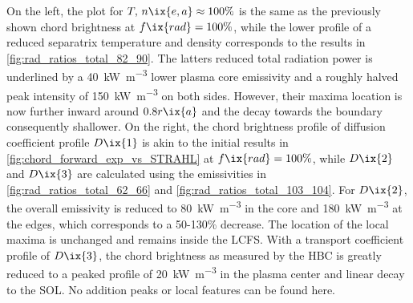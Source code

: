             On the left, the plot for $T,\,n\ix{e,a}\approx100\%$ is the same as the previously shown chord brightness at $f\ix{rad}=100\%$, while the lower profile of a reduced separatrix temperature and density corresponds to the results in \cref{fig:rad_ratios_total_82_90}. The latters reduced total radiation power is underlined by a \SI{40}{\kilo\watt\per\cubic\meter} lower plasma core emissivity and a roughly halved peak intensity of \SI{150}{\kilo\watt\per\cubic\meter} on both sides. However, their maxima location is now further inward around $0.8r\ix{a}$ and the decay towards the boundary consequently shallower. On the right, the chord brightness profile of diffusion coefficient profile $D\ix{1}$ is akin to the initial results in \cref{fig:chord_forward_exp_vs_STRAHL} at $f\ix{rad}=100\%$, while $D\ix{2}$ and $D\ix{3}$ are calculated using the emissivities in \cref{fig:rad_ratios_total_62_66} and \ref{fig:rad_ratios_total_103_104}. For $D\ix{2}$, the overall emissivity is reduced to \SI{80}{\kilo\watt\per\cubic\meter} in the core and \SI{180}{\kilo\watt\per\cubic\meter} at the edges, which corresponds to a 50-130\% decrease. The location of the local maxima is unchanged and remains inside the LCFS. With a transport coefficient profile of $D\ix{3}$, the chord brightness as measured by the HBC is greatly reduced to a peaked profile of \SI{20}{\kilo\watt\per\cubic\meter} in the plasma center and linear decay to the SOL. No addition peaks or local features can be found here.\\%
%
            \begin{figure}[t]%
                \centering%
                \begin{minipage}[b]{0.48\textwidth}%
                    \centering%
                \end{minipage}%
                \hfill%
                \begin{minipage}[b]{0.48\textwidth}%
                    \centering%
                \end{minipage}%
                \label{fig:core_v_sol_comparisons}%
            \end{figure}%
